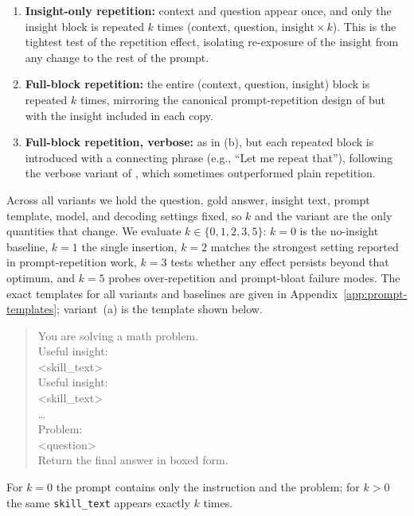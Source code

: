 \begin{enumerate}
  \item[\textbf{(a)}] \textbf{Insight-only repetition:} context and question appear
        once, and only the insight block is repeated $k$ times
        (context, question, $\text{insight} \times k$). This is the tightest test of
        the repetition effect, isolating re-exposure of the insight from any change
        to the rest of the prompt.
  \item[\textbf{(b)}] \textbf{Full-block repetition:} the entire
        (context, question, insight) block is repeated $k$ times, mirroring the
        canonical prompt-repetition design of \citet{leviathan2025prompt} but with
        the insight included in each copy.
  \item[\textbf{(c)}] \textbf{Full-block repetition, verbose:} as in (b), but each
        repeated block is introduced with a connecting phrase
        (e.g., ``Let me repeat that''), following the verbose variant of
        \citet{leviathan2025prompt}, which sometimes outperformed plain repetition.
\end{enumerate}

Across all variants we hold the question, gold answer, insight text, prompt template,
model, and decoding settings fixed, so $k$ and the variant are the only quantities
that change. We evaluate $k \in \{0,1,2,3,5\}$: $k{=}0$ is the no-insight baseline,
$k{=}1$ the single insertion, $k{=}2$ matches the strongest setting reported in
prompt-repetition work, $k{=}3$ tests whether any effect persists beyond that
optimum, and $k{=}5$ probes over-repetition and prompt-bloat failure modes. The exact
templates for all variants and baselines are given in
Appendix~\ref{app:prompt-templates}; variant~(a) is the template shown below.


\begin{quote}
\ttfamily\footnotesize
You are solving a math problem.\\[2pt]
Useful insight:\\
<skill\_text>\\[2pt]
Useful insight:\\
<skill\_text>\\
\ldots\\[2pt]
Problem:\\
<question>\\[2pt]
Return the final answer in boxed form.
\end{quote}

For $k=0$ the prompt contains only the instruction and the problem; for $k>0$ the
same \texttt{skill\_text} appears exactly $k$ times.


